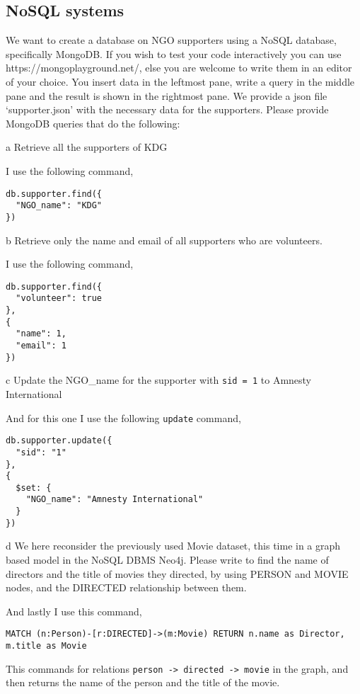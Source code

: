 \documentclass[working, oneside]{../../Preambles/tuftebook}
\begin{document}
\subsection*{NoSQL systems}
We want to create a database on NGO supporters using a NoSQL database, specifically
MongoDB. If you wish to test your code interactively you can
use https://mongoplayground.net/, else you are welcome to write them in an editor of your
choice. You insert data in the leftmost pane, write a query in the middle pane and the result
is shown in the rightmost pane. We provide a json file ‘supporter.json’ with the necessary
data for the supporters. Please provide MongoDB queries that do the following:
\begin{subexercise}{a}
Retrieve all the supporters of KDG
\end{subexercise}
\begin{solution}
I use the following command,
\begin{lstlisting}
db.supporter.find({
  "NGO_name": "KDG"
})
\end{lstlisting}
\end{solution}
\begin{subexercise}{b}
Retrieve only the name and email of all supporters who are volunteers.
\end{subexercise}
\begin{solution}
I use the following command,
\begin{lstlisting}
db.supporter.find({
  "volunteer": true
},
{
  "name": 1,
  "email": 1
})
\end{lstlisting}
\end{solution}
\begin{subexercise}{c}
Update the NGO\_name for the supporter with \texttt{sid = 1} to Amnesty International
\end{subexercise}
\begin{solution}
And for this one I use the following \texttt{update} command,
\begin{lstlisting}
db.supporter.update({
  "sid": "1"
},
{
  $set: {
    "NGO_name": "Amnesty International"
  }
})
\end{lstlisting}
\end{solution}
\begin{subexercise}{d}
We here reconsider the previously used Movie dataset, this time in a graph based model in the NoSQL DBMS Neo4j. Please write to find the name of directors and the title of movies they directed, by using PERSON and MOVIE nodes, and the DIRECTED relationship between them.
\end{subexercise}
\begin{solution}
And lastly I use this command,
\begin{lstlisting}
MATCH (n:Person)-[r:DIRECTED]->(m:Movie) RETURN n.name as Director, m.title as Movie
\end{lstlisting}
This commands for relations \texttt{person -> directed -> movie} in the graph, and then returns the name of the person and the title of the movie.
\end{solution}
\end{document}
